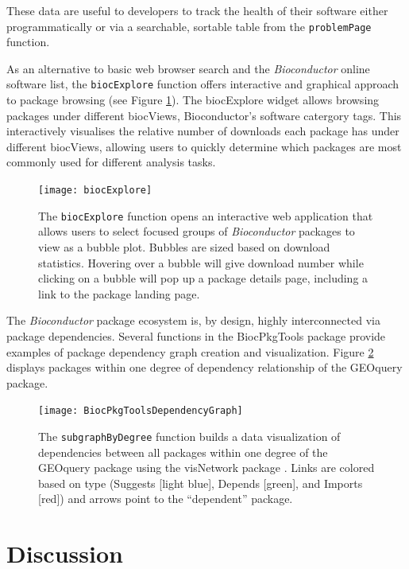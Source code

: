 \documentclass[9pt,a4paper]{extarticle}\usepackage[]{graphicx}\usepackage[]{color}
\begin{document}
These data are useful to developers to track the health of their
software either programmatically or via a searchable, sortable table
from the \texttt{problemPage} function.

As an alternative to basic web browser search and the
\emph{Bioconductor} online software list, the \texttt{biocExplore}
function offers interactive and graphical approach to package browsing
(see Figure \ref{fig:biocexplore}). The biocExplore widget allows browsing
packages under different biocViews, Bioconductor's software catergory tags. This
interactively visualises the relative number of downloads each package has under
different biocViews, allowing users to quickly determine which packages are most
commonly used for different analysis tasks.

\begin{figure}
  \texttt{[image: biocExplore]}
  \caption{The \texttt{biocExplore} function opens an interactive web application that allows users to select focused groups of \emph{Bioconductor} packages to view as a bubble plot. Bubbles are sized based on download statistics. Hovering over a bubble will give download number while clicking on a bubble will pop up a package details page, including a link to the package landing page.}
  \label{fig:biocexplore}
\end{figure}

The \emph{Bioconductor} package ecosystem is, by design, highly
interconnected via package dependencies. Several functions in the
BiocPkgTools package provide examples of package dependency graph
creation and visualization. Figure \ref{fig:dependencygraph} displays
packages within one degree of dependency relationship of the GEOquery
package.

\begin{figure}
  \texttt{[image: BiocPkgToolsDependencyGraph]}
  \caption{The \texttt{subgraphByDegree} function builds a data
    visualization of dependencies between all packages within one
    degree of the GEOquery package using the visNetwork package
    \citep{visNetwork}. Links are colored based on type (Suggests [light blue],
    Depends [green], and Imports [red]) and arrows point to the ``dependent''
    package. }
  \label{fig:dependencygraph}
\end{figure}

\section*{Discussion}
\end{document}
